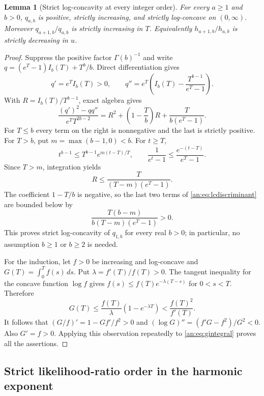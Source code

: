 \documentclass[11pt]{article}
\numberwithin{equation}{section}
\theoremstyle{plain}
\newtheorem{lemma}[theorem]{Lemma}
\theoremstyle{definition}
\theoremstyle{remark}
\begin{document}
\begin{lemma}[Strict log-concavity at every integer order]
\label{an:lem:logconcavity}
For every $a\ge1$ and $b>0$, $q_{a,b}$ is positive, strictly
increasing, and strictly log-concave on $(0,\infty)$.
Moreover $q_{a+1,b}/q_{a,b}$ is strictly increasing in $T$.
Equivalently $h_{a+1,b}/h_{a,b}$ is strictly decreasing in $u$.
\end{lemma}
\begin{proof}
Suppress the positive factor $\Gamma(b)^{-1}$ and write
$q=(e^T-1)I_b(T)+T^b/b$. Direct differentiation gives
\[
 q'=e^TI_b(T)>0,\qquad
 q''=e^T\left(I_b(T)-\frac{T^{b-1}}{e^T-1}\right).
\]
With $R=I_b(T)/T^{b-1}$, exact algebra gives
\begin{equation}\label{an:eq:lcdiscriminant}
 \frac{(q')^2-qq''}{e^TT^{2b-2}}
 =R^2+\left(1-\frac Tb\right)R
       +\frac{T}{b(e^T-1)}.
\end{equation}
For $T\le b$ every term on the right is nonnegative and the last is
strictly positive. For $T>b$, put $m=\max(b-1,0)<b$. For $t\ge T$,
\[
 t^{b-1}\le T^{b-1}e^{m(t-T)/T},\qquad
 \frac1{e^t-1}\le\frac{e^{-(t-T)}}{e^T-1}.
\]
Since $T>m$, integration yields
\[
 R\le\frac{T}{(T-m)(e^T-1)}.
\]
The coefficient $1-T/b$ is negative, so the last two terms of
\eqref{an:eq:lcdiscriminant} are bounded below by
\[
 \frac{T(b-m)}{b(T-m)(e^T-1)}>0.
\]
This proves strict log-concavity of $q_{1,b}$ for every real $b>0$;
in particular, no assumption $b\ge1$ or $b\ge2$ is needed.

For the induction, let $f>0$ be increasing and log-concave and
$G(T)=\int_0^Tf(s)\,ds$. Put $\lambda=f'(T)/f(T)>0$.
The tangent inequality for the concave function $\log f$ gives
$f(s)\le f(T)e^{-\lambda(T-s)}$ for $0<s<T$. Therefore
\[
 G(T)\le\frac{f(T)}\lambda(1-e^{-\lambda T})
       <\frac{f(T)^2}{f'(T)}.
\]
It follows that $(G/f)'=1-Gf'/f^2>0$ and
$(\log G)''=(f'G-f^2)/G^2<0$. Also $G'=f>0$.
Applying this observation repeatedly to \eqref{an:eq:gintegral}
proves all the assertions.
\end{proof}

\subsection{Strict likelihood-ratio order in the harmonic exponent}
\end{document}
